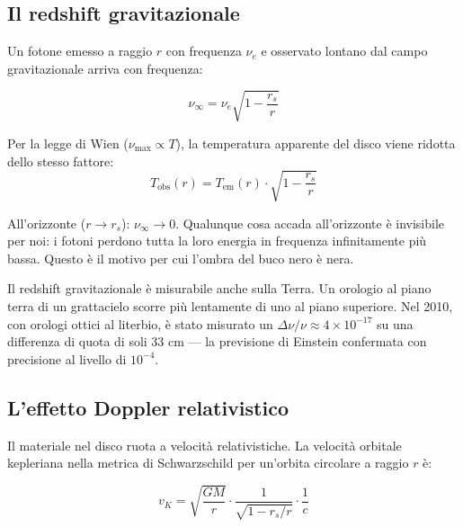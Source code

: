\documentclass[12pt, a4paper, twoside]{article}
\newenvironment{physbox}[1]{%
  \begin{tcolorbox}[equationbox, title={#1}]
}{%
  \end{tcolorbox}
}
\newenvironment{curiosity}[1]{%
  \begin{tcolorbox}[curiositybox, title={Curiosit\`a: #1}]
}{%
  \end{tcolorbox}
}
\theoremstyle{definition}
\newcommand{\RS}{r_{\!s}}          %
\newcommand{\Tobs}{T_{\text{obs}}} %
\newcommand{\Tem}{T_{\text{em}}}   %
\begin{document}
\subsection{Il redshift gravitazionale}

Un fotone emesso a raggio $r$ con frequenza $\nu_e$ e osservato lontano dal
campo gravitazionale arriva con frequenza:

\begin{physbox}{Redshift Gravitazionale di Schwarzschild}
\begin{equation}
  \nu_\infty = \nu_e \sqrt{1 - \frac{\RS}{r}}
  \label{eq:redshift}
\end{equation}
\end{physbox}

Per la legge di Wien ($\nu_{\max} \propto T$), la temperatura apparente
del disco viene ridotta dello stesso fattore:
\begin{equation}
  \Tobs(r) = \Tem(r) \cdot \sqrt{1 - \frac{\RS}{r}}
\end{equation}

All'orizzonte ($r \to \RS$): $\nu_\infty \to 0$. Qualunque cosa accada
all'orizzonte è invisibile per noi: i fotoni perdono tutta la loro energia
in frequenza infinitamente più bassa. Questo è il motivo per cui l'ombra
del buco nero è nera.

\begin{curiosity}{Il redshift gravitazionale misurato sulla Terra}
  Il redshift gravitazionale è misurabile anche sulla Terra. Un orologio
  al piano terra di un grattacielo scorre più lentamente di uno al piano
  superiore. Nel 2010, con orologi ottici al literbio, è stato misurato
  un $\Delta\nu/\nu \approx 4 \times 10^{-17}$ su una differenza di quota
  di soli 33 cm — la previsione di Einstein confermata con precisione
  al livello di $10^{-4}$.
\end{curiosity}

\subsection{L'effetto Doppler relativistico}

Il materiale nel disco ruota a velocità relativistiche. La velocità orbitale
kepleriana nella metrica di Schwarzschild per un'orbita circolare a raggio $r$ è:

\begin{equation}
  v_K = \sqrt{\frac{GM}{r}} \cdot \frac{1}{\sqrt{1 - \RS/r}} \cdot \frac{1}{c}
\end{equation}
\end{document}
